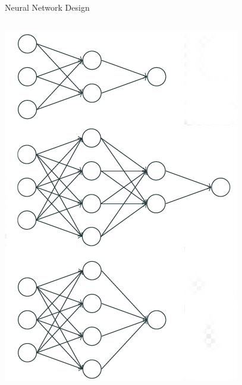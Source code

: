 \documentclass{beamer}
\begin{document}
\begin{frame}{Neural Network Design}
\begin{columns}
\begin{column}{0.5\textwidth}
\begin{center}
              \includegraphics[width=0.8\linewidth]{GA_images/neural-network.png}
        \end{center}
    \end{column}
\end{columns}
\end{frame}
\end{document}

